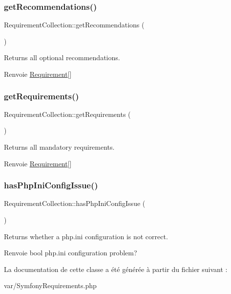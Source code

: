 \subsubsection{\texorpdfstring{get\+Recommendations()}{getRecommendations()}}
{\footnotesize\ttfamily Requirement\+Collection\+::get\+Recommendations (\begin{DoxyParamCaption}{ }\end{DoxyParamCaption})}

Returns all optional recommendations.

\begin{DoxyReturn}{Renvoie}
\hyperlink{classRequirement}{Requirement}\mbox{[}\mbox{]} 
\end{DoxyReturn}
\mbox{\label{classRequirementCollection_a86ec2f872cec0395bc1f0206c2de8c6d}} 
\subsubsection{\texorpdfstring{get\+Requirements()}{getRequirements()}}
{\footnotesize\ttfamily Requirement\+Collection\+::get\+Requirements (\begin{DoxyParamCaption}{ }\end{DoxyParamCaption})}

Returns all mandatory requirements.

\begin{DoxyReturn}{Renvoie}
\hyperlink{classRequirement}{Requirement}\mbox{[}\mbox{]} 
\end{DoxyReturn}
\mbox{\label{classRequirementCollection_ae2b1f4fc39d0139dbebe0783cc100029}} 
\subsubsection{\texorpdfstring{has\+Php\+Ini\+Config\+Issue()}{hasPhpIniConfigIssue()}}
{\footnotesize\ttfamily Requirement\+Collection\+::has\+Php\+Ini\+Config\+Issue (\begin{DoxyParamCaption}{ }\end{DoxyParamCaption})}

Returns whether a php.\+ini configuration is not correct.

\begin{DoxyReturn}{Renvoie}
bool php.\+ini configuration problem? 
\end{DoxyReturn}


La documentation de cette classe a été générée à partir du fichier suivant \+:\begin{DoxyCompactItemize}
\item 
var/Symfony\+Requirements.\+php\end{DoxyCompactItemize}
